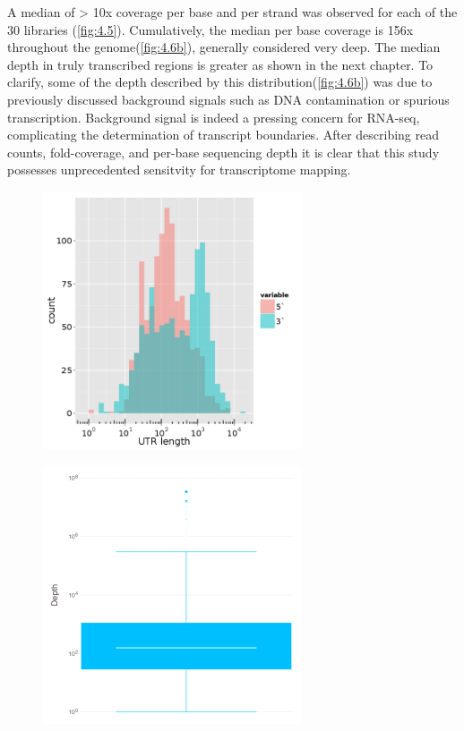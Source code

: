 A median of > 10x coverage per base and per strand was observed for each of the 30 libraries (\ref{fig:4.5}). Cumulatively, the median per base coverage is 156x throughout the genome(\ref{fig:4.6b}), generally considered very deep. The median depth in truly transcribed regions is greater as shown in the next chapter. To clarify, some of the depth described by this distribution(\ref{fig:4.6b}) was due to previously discussed background signals such as DNA contamination\cite{176} or spurious transcription.\cite{164,165} Background signal is indeed a pressing concern for RNA-seq,\cite{110,176,57} complicating the determination of transcript boundaries. After describing read counts, fold-coverage, and per-base sequencing depth it is clear that this study possesses unprecedented sensitvity for transcriptome mapping.


\begin{figure}
\begin{center}
\begin{minipage}{.5\textwidth}
\begin{center}
{\includegraphics[width=\linewidth,height=3in]{images/Assembly/Summary/putrlength.png}}
\label{fig:4.6a}
\end{center}
\end{minipage}%
\begin{minipage}{.5\textwidth}
\begin{center}
{\includegraphics[width=\linewidth,height=3in]{images/Sequencing/Cumulative_depth_boxplot.png}}

\end{center}
\end{minipage}
\end{center}
\end{figure}
